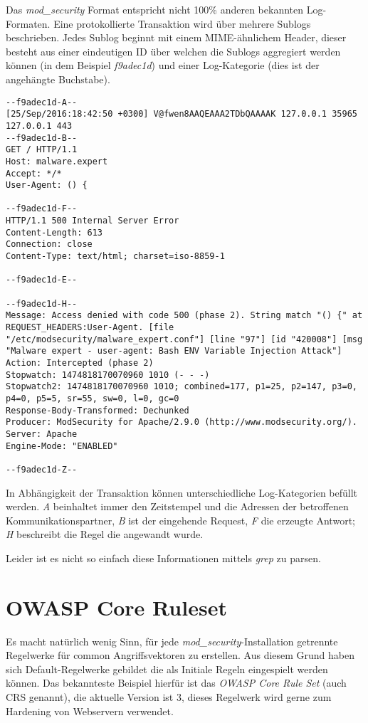 Das \textit{mod\_security} Format entspricht nicht 100\% anderen bekannten Log-Formaten. Eine protokollierte Transaktion wird über mehrere Sublogs beschrieben. Jedes Sublog beginnt mit einem MIME-ähnlichem Header, dieser besteht aus einer eindeutigen ID über welchen die Sublogs aggregiert werden können (in dem Beispiel \textit{f9adec1d}) und einer Log-Kategorie (dies ist der angehängte Buchstabe).

\begin{verbatim}
--f9adec1d-A--
[25/Sep/2016:18:42:50 +0300] V@fwen8AAQEAAA2TDbQAAAAK 127.0.0.1 35965 127.0.0.1 443
--f9adec1d-B--
GET / HTTP/1.1
Host: malware.expert
Accept: */*
User-Agent: () {

--f9adec1d-F--
HTTP/1.1 500 Internal Server Error
Content-Length: 613
Connection: close
Content-Type: text/html; charset=iso-8859-1

--f9adec1d-E--

--f9adec1d-H--
Message: Access denied with code 500 (phase 2). String match "() {" at REQUEST_HEADERS:User-Agent. [file "/etc/modsecurity/malware_expert.conf"] [line "97"] [id "420008"] [msg "Malware expert - user-agent: Bash ENV Variable Injection Attack"]
Action: Intercepted (phase 2)
Stopwatch: 1474818170070960 1010 (- - -)
Stopwatch2: 1474818170070960 1010; combined=177, p1=25, p2=147, p3=0, p4=0, p5=5, sr=55, sw=0, l=0, gc=0
Response-Body-Transformed: Dechunked
Producer: ModSecurity for Apache/2.9.0 (http://www.modsecurity.org/).
Server: Apache
Engine-Mode: "ENABLED"

--f9adec1d-Z--
\end{verbatim}

In Abhängigkeit der Transaktion können unterschiedliche Log-Kategorien befüllt werden. \textit{A} beinhaltet immer den Zeitstempel und die Adressen der betroffenen Kommunikationspartner, \textit{B} ist der eingehende Request, \textit{F} die erzeugte Antwort; \textit{H} beschreibt die Regel die angewandt wurde.

Leider ist es nicht so einfach diese Informationen mittels \textit{grep} zu parsen.

\section{OWASP Core Ruleset}

Es macht natürlich wenig Sinn, für jede \textit{mod\_security}-Installation getrennte Regelwerke für common Angriffsvektoren zu erstellen. Aus diesem Grund haben sich Default-Regelwerke gebildet die als Initiale Regeln eingespielt werden können. Das bekannteste Beispiel hierfür ist das \textit{OWASP Core Rule Set} (auch CRS genannt), die aktuelle Version ist 3, dieses Regelwerk wird gerne zum Hardening von Webservern verwendet.

